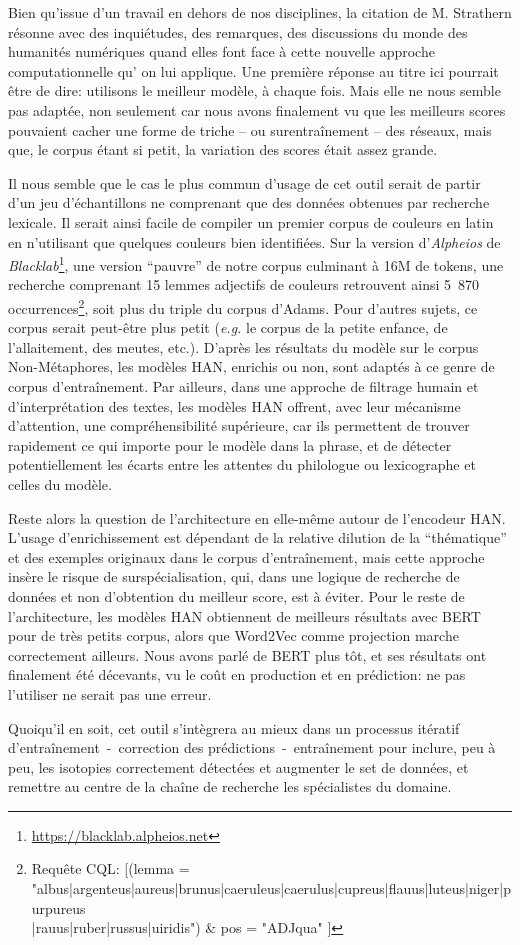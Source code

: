 Bien qu'issue d'un travail en dehors de nos disciplines, la citation de M. Strathern résonne avec des inquiétudes, des remarques, des discussions du monde des humanités numériques quand elles font face à cette nouvelle approche computationnelle qu’ on lui applique. Une première réponse au titre ici pourrait être de dire: utilisons le meilleur modèle, à chaque fois. Mais elle ne nous semble pas adaptée, non seulement car nous avons finalement vu que les meilleurs scores pouvaient cacher une forme de triche -- ou surentraînement -- des réseaux, mais que, le corpus étant si petit, la variation des scores était assez grande.

Il nous semble que le cas le plus commun d'usage de cet outil serait de partir d'un jeu d'échantillons ne comprenant que des données obtenues par recherche lexicale. Il serait ainsi facile de compiler un premier corpus de couleurs en latin en n'utilisant que quelques couleurs bien identifiées. Sur la version d'\textit{Alpheios} de \textit{Blacklab}\footnote{\url{https://blacklab.alpheios.net}}, une version \enquote{pauvre} de notre corpus culminant à 16M de tokens, une recherche comprenant 15 lemmes adjectifs de couleurs retrouvent ainsi 5~870 occurrences\footnote{Requête CQL: {[(lemma = "albus|argenteus|aureus|brunus|caeruleus|caerulus|cupreus|flauus|luteus|niger|purpureus\\|rauus|ruber|russus|uiridis") \& pos = "ADJqua" ]}}, soit plus du triple du corpus d'Adams. Pour d'autres sujets, ce corpus serait peut-être plus petit (\textit{e.g.} le corpus de la petite enfance, de l'allaitement, des meutes, etc.). D'après les résultats du modèle sur le corpus Non-Métaphores, les modèles HAN, enrichis ou non, sont adaptés à ce genre de corpus d'entraînement. Par ailleurs, dans une approche de filtrage humain et d'interprétation des textes, les modèles HAN offrent, avec leur mécanisme d'attention, une compréhensibilité supérieure, car ils permettent de trouver rapidement ce qui importe pour le modèle dans la phrase, et de détecter potentiellement les écarts entre les attentes du philologue ou lexicographe et celles du modèle. 

Reste alors la question de l'architecture en elle-même autour de l'encodeur HAN. L'usage d'enrichissement est dépendant de la relative dilution de la \enquote{thématique} et des exemples originaux dans le corpus d'entraînement, mais cette approche insère le risque de surspécialisation, qui, dans une logique de recherche de données et non d'obtention du meilleur score, est à éviter. Pour le reste de l'architecture, les modèles HAN obtiennent de meilleurs résultats avec BERT pour de très petits corpus, alors que Word2Vec comme projection marche correctement ailleurs. Nous avons parlé de BERT plus tôt, et ses résultats ont finalement été décevants, vu le coût en production et en prédiction: ne pas l'utiliser ne serait pas une erreur.

Quoiqu'il en soit, cet outil s'intègrera au mieux dans un processus itératif d'entraînement~-~correction des prédictions~-~entraînement pour inclure, peu à peu, les isotopies correctement détectées et augmenter le set de données, et remettre au centre de la chaîne de recherche les spécialistes du domaine.